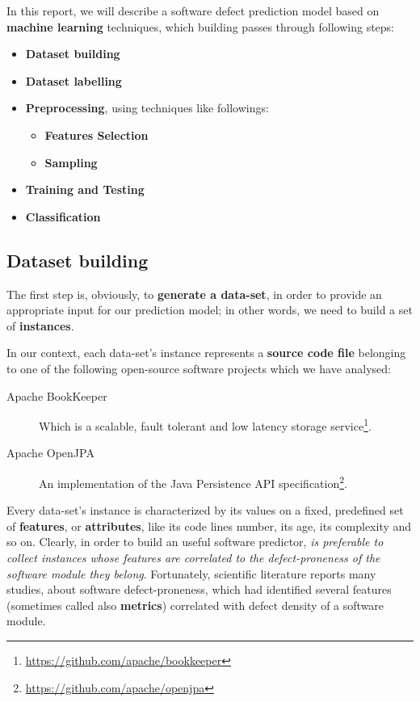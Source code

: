 \documentclass[sigconf]{acmart}
\begin{document}
In this report, we will describe a software defect prediction model based on \textbf{machine learning} techniques, which building passes through following steps:

\begin{itemize}
\item \textbf{Dataset building}
\item \textbf{Dataset labelling}
\item \textbf{Preprocessing}, using techniques like followings: 
\begin{itemize}
\item \textbf{Features Selection}
\item \textbf{Sampling}
\end{itemize}

\item \textbf{Training and Testing}
\item \textbf{Classification}
\end{itemize}


\subsection{Dataset building}

The first step is, obviously, to \textbf{generate a data-set}, in order to provide an appropriate input for our prediction model; in other words, we need to build a set of \textbf{instances}. 

In our context, each data-set's instance represents a \textbf{source code file} belonging to one of the following open-source software projects which we have analysed:

\begin{description}
\item[Apache BookKeeper\texttrademark]Which is a scalable, fault tolerant and low latency storage service\footnote{\url{https://github.com/apache/bookkeeper}}.
\item[Apache OpenJPA\texttrademark]An implementation of the Java Persistence API specification\footnote{\url{https://github.com/apache/openjpa}}. 
\end{description}

Every data-set's instance is characterized by its values on a fixed, predefined set of \textbf{features}, or \textbf{attributes}, like its code lines number, its age, its complexity and so on. Clearly, in order to build an useful software predictor, \textit{is preferable to collect instances whose features are correlated to the defect-proneness of the software module they belong}. Fortunately, scientific literature reports many studies, about software defect-proneness, which had identified several features (sometimes called also \textbf{metrics}) correlated with defect density of a software module. 
\end{document}
